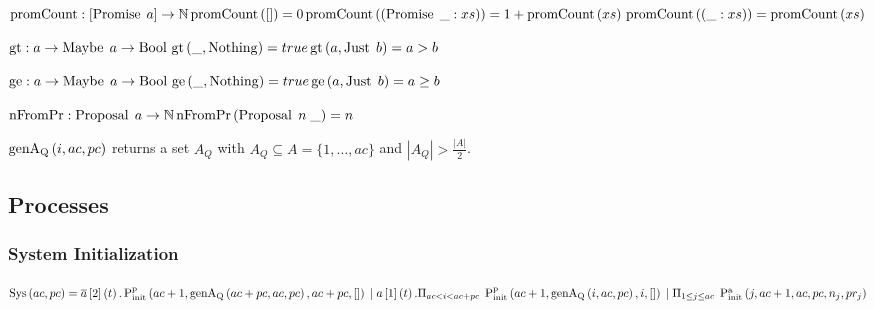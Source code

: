 $\operatorname{promCount} : [\operatorname{Promise}\; a] \to \mathbb{N}\\
\operatorname{promCount}\left([]\right) = 0\\
\operatorname{promCount}\left(\left(\operatorname{Promise}\; \_:xs\right)\right) = 1 + \operatorname{promCount}\left(xs\right)\\
\operatorname{promCount}\left(\left(\_:xs\right)\right) = \operatorname{promCount}\left(xs\right)$

$\operatorname{gt}: a \to \operatorname{Maybe}\; a \to \operatorname{Bool}\\
\operatorname{gt}\left(\_, \operatorname{Nothing}\right) = true\\
\operatorname{gt}\left(a, \operatorname{Just}\; b\right) = a > b$

$\operatorname{ge}: a \to \operatorname{Maybe}\; a \to \operatorname{Bool}\\
\operatorname{ge}\left(\_, \operatorname{Nothing}\right) = true\\
\operatorname{ge}\left(a, \operatorname{Just}\; b\right) = a \ge b$

$\operatorname{nFromPr} : \operatorname{Proposal}\; a \to \mathbb{N}\\
\operatorname{nFromPr}\left(\operatorname{Proposal}\; n\; \_ \right) = n$

$\operatorname{genA_Q}\left(i, ac, pc\right)$ returns a set $A_Q$ with $A_Q \subseteq A = \{1, \dots, ac\}$ and $|A_Q| > \frac{|A|}{2}$.

\subsection{Processes}
\newcommand{\Sys}[2]{\operatorname{Sys}\left(#1, #2\right)}
\newcommand{\Pa}[0]{\operatorname{P^a}}
\newcommand{\Pp}[0]{\operatorname{P^p}}
\newcommand{\PaCont}[0]{\operatorname{P^a_{cont}}}

\newcommand{\PpInit}[4]{\operatorname{P^p_{init}}\left(#1, #2, #3, #4\right)}
\newcommand{\PaInit}[6]{\operatorname{P^a_{init}}\left(#1, #2, #3, #4, #5, #6\right)}

\subsubsection{System Initialization}
\newcommand{\SessionRequest}[3]{\overline{#1}\left[#2\right]\left(#3\right)}
\newcommand{\SessionAccept}[3]{#1\left[#2\right]\left(#3\right)}
\newcommand{\ParallelFor}[1]{\Pi_{#1}\;}

$\Sys{ac}{pc} = \SessionRequest{a}{2}{t} . \PpInit{ac + 1}{\genAq{ac + pc}{ac}{pc}}{ac + pc}{[]}\\
\Or \SessionAccept{a}{1}{t} . \ParallelFor{ac < i < ac + pc} \PpInit{ac + 1}{\genAq{i}{ac}{pc}}{i}{[]} \\
\Or \ParallelFor{1 \le j \le ac} \PaInit{j}{ac + 1}{ac}{pc}{n_j}{pr_j}$


